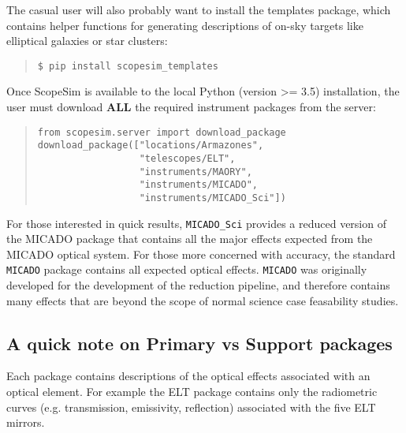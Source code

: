 The casual user will also probably want to install the templates package, which contains helper functions for generating descriptions of on-sky targets like elliptical galaxies or star clusters:

\begin{quote}
\begin{alltt}
\begin{lstlisting}[frame=single]
$ pip install scopesim_templates
\end{lstlisting}
\end{alltt}
\end{quote}

Once ScopeSim is available to the local Python (version >= 3.5) installation, the user must download \textbf{ALL} the required instrument packages from the server:

\begin{quote}
\begin{alltt}
\begin{lstlisting}[frame=single]
from scopesim.server import download_package
download_package(["locations/Armazones",
                  "telescopes/ELT",
                  "instruments/MAORY",
                  "instruments/MICADO",
                  "instruments/MICADO_Sci"])
\end{lstlisting}
\end{alltt}
\end{quote}


For those interested in quick results, \texttt{MICADO\_Sci} provides a reduced version of the MICADO package that contains all the major effects expected from the MICADO optical system.
For those more concerned with accuracy, the standard \texttt{MICADO} package contains all expected optical effects.
\texttt{MICADO} was originally developed for the development of the reduction pipeline, and therefore contains many effects that are beyond the scope of normal science case feasability studies.


\subsection{A quick note on Primary vs Support packages%
  \label{a-quick-note-on-primary-vs-support-packages}%
}

Each package contains descriptions of the optical effects associated with an optical element.
For example the ELT package contains only the radiometric curves (e.g. transmission, emissivity, reflection) associated with the five ELT mirrors.

